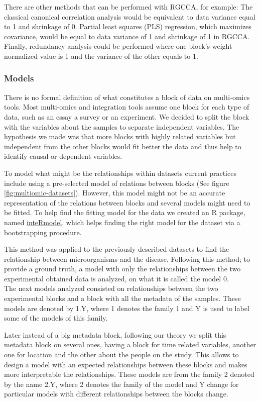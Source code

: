 \documentclass[
  12pt,
  a4paper,
  twoside,
  openright]{book}
\begin{document}
There are other methods that can be performed with RGCCA, for example: The classical canonical correlation analysis would be equivalent to data variance equal to 1 and shrinkage of 0.
Partial least squares (PLS) regression, which maximizes covariance, would be equal to data variance of 1 and shrinkage of 1 in RGCCA.
Finally, redundancy analysis could be performed where one block's weight normalized value is 1 and the variance of the other equals to 1.

\hypertarget{models}{%
\subsubsection{Models}\label{models}}

There is no formal definition of what constitutes a block of data on multi-omics tools.
Most multi-omics and integration tools assume one block for each type of data, such as an essay a survey or an experiment.
We decided to split the block with the variables about the samples to separate independent variables.
The hypothesis we made was that more blocks with highly related variables but independent from the other blocks would fit better the data and thus help to identify causal or dependent variables.

To model what might be the relationships within datasets current practices include using a pre-selected model of relations between blocks (See figure \ref{fig:multiomic-datasets}).
However, this model might not be an accurate representation of the relations between blocks and several models might need to be fitted.
To help find the fitting model for the data we created an R package, named \href{https://llrs.github.io/inteRmodel/}{inteRmodel}, which helps finding the right model for the dataset via a bootstrapping procedure.

This method was applied to the previously described datasets to find the relationship between microorganisms and the disease.
Following this method; to provide a ground truth, a model with only the relationships between the two experimental obtained data is analyzed, on what it is called the model 0.\\
The next models analyzed consisted on relationships between the two experimental blocks and a block with all the metadata of the samples.
These models are denoted by 1.Y, where 1 denotes the family 1 and Y is used to label some of the models of this family.

Later instead of a big metadata block, following our theory we split this metadata block on several ones, having a block for time related variables, another one for location and the other about the people on the study.
This allows to design a model with an expected relationships between these blocks and makes more interpretable the relationships.
These models are from the family 2 denoted by the name 2.Y, where 2 denotes the family of the model and Y change for particular models with different relationships between the blocks change.
\end{document}
